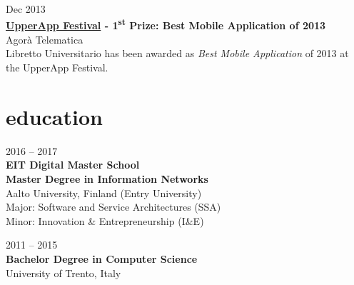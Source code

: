 \documentclass[]{friggeri-cv} %
\begin{document}
{Dec 2013} \\
{\textbf{\href{http://www.upperapp.it}{UpperApp Festival} - 1\textsuperscript{st} Prize: Best Mobile Application of 2013} \\
{Agorà Telematica} \\
Libretto Universitario has been awarded as \textit{Best Mobile Application} of 2013 at the UpperApp Festival.}


\section{education}


{2016 -- 2017} \\
\textbf{EIT Digital Master School} \\
\textbf{Master Degree {\normalfont in Information Networks}} \\
{Aalto University, Finland (Entry University)} \\
{Major: Software and Service Architectures (SSA) \\
Minor: Innovation \& Entrepreneurship (I\&E)}

{2011 -- 2015} \\
\textbf{Bachelor Degree {\normalfont in Computer Science}} \\
{University of Trento, Italy}





\end{document}
